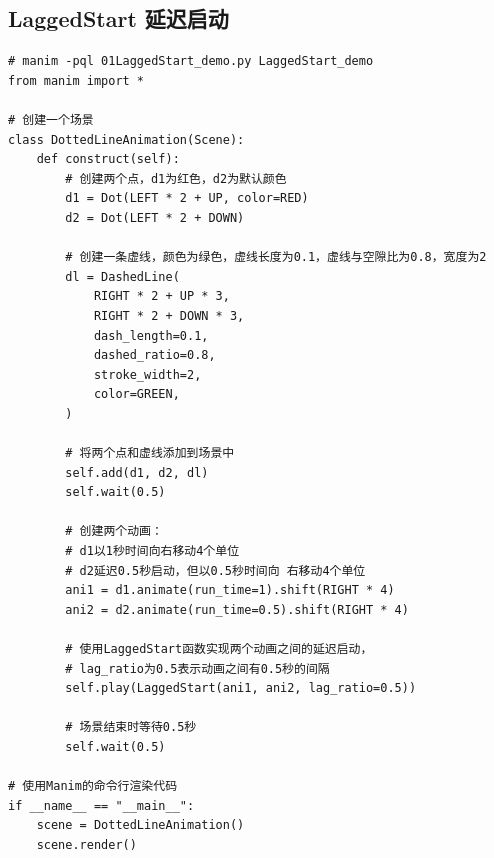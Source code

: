 \subsection{LaggedStart 延迟启动}
\label{subsubsec:manim_animation_group_laggedstart}
\begin{lstlisting}[style=pythonstyle]
# manim -pql 01LaggedStart_demo.py LaggedStart_demo
from manim import *

# 创建一个场景
class DottedLineAnimation(Scene):
    def construct(self):
        # 创建两个点，d1为红色，d2为默认颜色
        d1 = Dot(LEFT * 2 + UP, color=RED)
        d2 = Dot(LEFT * 2 + DOWN)

        # 创建一条虚线，颜色为绿色，虚线长度为0.1，虚线与空隙比为0.8，宽度为2
        dl = DashedLine(
            RIGHT * 2 + UP * 3,
            RIGHT * 2 + DOWN * 3,
            dash_length=0.1,
            dashed_ratio=0.8,
            stroke_width=2,
            color=GREEN,
        )

        # 将两个点和虚线添加到场景中
        self.add(d1, d2, dl)
        self.wait(0.5)

        # 创建两个动画：
        # d1以1秒时间向右移动4个单位
        # d2延迟0.5秒启动，但以0.5秒时间向 右移动4个单位
        ani1 = d1.animate(run_time=1).shift(RIGHT * 4)
        ani2 = d2.animate(run_time=0.5).shift(RIGHT * 4)

        # 使用LaggedStart函数实现两个动画之间的延迟启动，
        # lag_ratio为0.5表示动画之间有0.5秒的间隔
        self.play(LaggedStart(ani1, ani2, lag_ratio=0.5))

        # 场景结束时等待0.5秒
        self.wait(0.5)

# 使用Manim的命令行渲染代码
if __name__ == "__main__":
    scene = DottedLineAnimation()
    scene.render()
\end{lstlisting}

